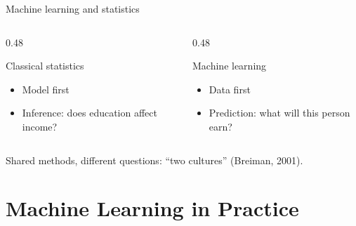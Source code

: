 \documentclass[handout,aspectratio=169,t,9pt]{beamer}
\begin{document}
\begin{frame}{Machine learning and statistics}
  \begin{columns}[T,onlytextwidth]
    \begin{column}{0.48\textwidth}
      \begin{sibbox}{Classical statistics}
        \begin{itemize}
          \item Model first
          \item Inference: does education affect income?
        \end{itemize}
      \end{sibbox}
    \end{column}
    \begin{column}{0.48\textwidth}
      \begin{sibbox}{Machine learning}
        \begin{itemize}
          \item Data first
          \item Prediction: what will this person earn?
        \end{itemize}
      \end{sibbox}
    \end{column}
  \end{columns}

  \vfill
  \begin{takeaway}
    Shared methods, different questions: ``two cultures'' (Breiman, 2001).
  \end{takeaway}

\end{frame}

\section{Machine Learning in Practice}
\end{document}

